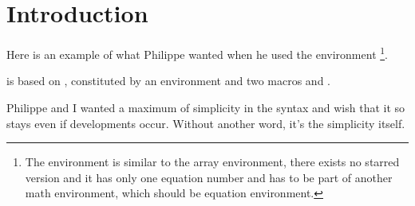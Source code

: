 \documentclass[DIV=14,
               fontsize=10,
               headinclude=false,
               index=totoc,
               footinclude=false,
               headings=small]{tkz-doc}
\begin{document}
\setlength{\parskip}{1ex plus 0.5ex minus 0.2ex}

\section{Introduction}

Here is an example of what Philippe wanted when he used the environment  \footnote{The   environment is similar to the array environment, there exists no  starred version and it has only one equation number and has to be part of another math environment, which should be equation environment.}.

\bigskip

\begin{center}
\end{center}


\bigskip
{} is based  on
 \tikzname{}, constituted by an  environment    and two macros   and  .

Philippe and I wanted a maximum of simplicity in the syntax and wish that it so stays even if developments occur. Without another word, it's the simplicity itself.
\end{document}
